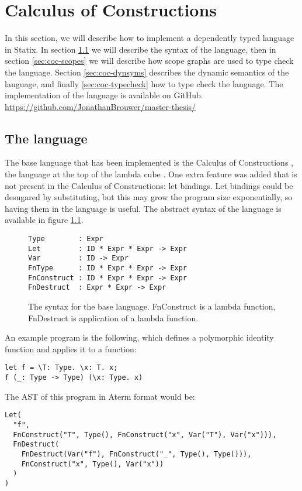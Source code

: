 \chapter{Calculus of Constructions}
\label{chap:baselang}

In this section, we will describe how to implement a dependently typed language in Statix. In section \ref{sec:coc-syntax} we will describe the syntax of the language, then in section \ref{sec:coc-scopes} we will describe how scope graphs are used to type check the language. Section \ref{sec:coc-dynsyms} describes the dynamic semantics of the language, and finally \ref{sec:coc-typecheck} how to type check the language. The implementation of the language is available on GitHub.
\url{https://github.com/JonathanBrouwer/master-thesis/}

\section{The language}
\label{sec:coc-syntax}

The base language that has been implemented is the Calculus of Constructions \cite{Coquand_Huet_1988}, the language at the top of the lambda cube \cite{lambda_cube}. One extra feature was added that is not present in the Calculus of Constructions: let bindings. Let bindings could be desugared by substituting, but this may grow the program size exponentially, so having them in the language is useful. The abstract syntax of the language is available in figure \ref{fig:syntax}.

\begin{figure}[h]
\begin{lstlisting}
Type        : Expr
Let         : ID * Expr * Expr -> Expr
Var         : ID -> Expr
FnType      : ID * Expr * Expr -> Expr
FnConstruct : ID * Expr * Expr -> Expr
FnDestruct  : Expr * Expr -> Expr
\end{lstlisting}
\caption{The syntax for the base language. FnConstruct is a lambda function, FnDestruct is application of a lambda function.}
\label{fig:syntax}
\end{figure}

An example program is the following, which defines a polymorphic identity function and applies it to a function:

\begin{lstlisting}
let f = \T: Type. \x: T. x;
f (_: Type -> Type) (\x: Type. x)
\end{lstlisting}
The AST of this program in Aterm format\cite{aterm} would be:
\begin{lstlisting}
Let(
  "f",
  FnConstruct("T", Type(), FnConstruct("x", Var("T"), Var("x"))),
  FnDestruct(
	FnDestruct(Var("f"), FnConstruct("_", Type(), Type())),
	FnConstruct("x", Type(), Var("x"))
  )
)
\end{lstlisting}



